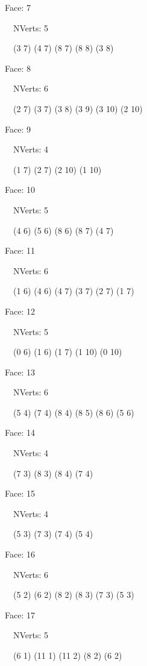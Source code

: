 \documentclass{article}
\begin{document}
{\footnotesize 

Face: 7

\   \    NVerts: 5

 \   \   (3 7) (4 7) (8 7) (8 8) (3 8)}

{\footnotesize 

Face: 8

\   \    NVerts: 6

 \   \   (2 7) (3 7) (3 8) (3 9) (3 10) (2 10)}

{\footnotesize 

Face: 9

\   \    NVerts: 4

 \   \   (1 7) (2 7) (2 10) (1 10)}

{\footnotesize 

Face: 10

\   \    NVerts: 5

 \   \   (4 6) (5 6) (8 6) (8 7) (4 7)}

{\footnotesize 

Face: 11

\   \    NVerts: 6

 \   \   (1 6) (4 6) (4 7) (3 7) (2 7) (1 7)}

{\footnotesize 

Face: 12

\   \    NVerts: 5

 \   \   (0 6) (1 6) (1 7) (1 10) (0 10)}

{\footnotesize 

Face: 13

\   \    NVerts: 6

 \   \   (5 4) (7 4) (8 4) (8 5) (8 6) (5 6)}

{\footnotesize 

Face: 14

\   \    NVerts: 4

 \   \   (7 3) (8 3) (8 4) (7 4)}

{\footnotesize 

Face: 15

\   \    NVerts: 4

 \   \   (5 3) (7 3) (7 4) (5 4)}

{\footnotesize 

Face: 16

\   \    NVerts: 6

 \   \   (5 2) (6 2) (8 2) (8 3) (7 3) (5 3)}

{\footnotesize 

Face: 17

\   \    NVerts: 5

 \   \   (6 1) (11 1) (11 2) (8 2) (6 2)}
\end{document}
